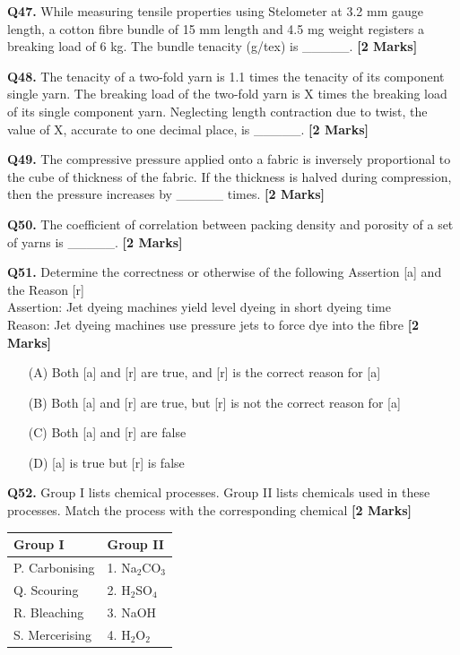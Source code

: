 \documentclass[11pt]{article}
\newcommand{\questionb}[2]{
    \noindent\textbf{Q#2.} #1 \hfill \textbf{[2 Marks]}
}
\begin{document}
\questionb{While measuring tensile properties using Stelometer at 3.2 mm gauge length, a cotton fibre bundle of 15 mm length and 4.5 mg weight registers a breaking load of 6 kg. The bundle tenacity (g/tex) is \_\_\_\_\_.}{47}
\vspace{0.5cm}

\questionb{The tenacity of a two-fold yarn is 1.1 times the tenacity of its component single yarn. The breaking load of the two-fold yarn is X times the breaking load of its single component yarn. Neglecting length contraction due to twist, the value of X, accurate to one decimal place, is \_\_\_\_\_.}{48}
\vspace{0.5cm}

\questionb{The compressive pressure applied onto a fabric is inversely proportional to the cube of thickness of the fabric. If the thickness is halved during compression, then the pressure increases by \_\_\_\_\_ times.}{49}
\vspace{0.5cm}

\questionb{The coefficient of correlation between packing density and porosity of a set of yarns is \_\_\_\_\_.}{50}
\vspace{0.5cm}

\questionb{Determine the correctness or otherwise of the following Assertion [a] and the Reason [r] \\

Assertion: Jet dyeing machines yield level dyeing in short dyeing time \\ 
Reason: Jet dyeing machines use pressure jets to force dye into the fibre }{51} 

\begin{enumerate}
    \item[(A)] Both [a] and [r] are true, and [r] is the correct reason for [a]  
    \item[(B)] Both [a] and [r] are true, but [r] is not the correct reason for [a]  
    \item[(C)] Both [a] and [r] are false  
    \item[(D)] [a] is true but [r] is false  
\end{enumerate}
\vspace{0.5cm}

\questionb{Group I lists chemical processes. Group II lists chemicals used in these processes. Match the process with the corresponding chemical}{52}

\begin{center}
\begin{tabular}{|l|l|}
\hline
\textbf{Group I} & \textbf{Group II} \\
\hline
P. Carbonising & 1. Na\(_2\)CO\(_3\) \\
Q. Scouring & 2. H\(_2\)SO\(_4\) \\
R. Bleaching & 3. NaOH \\
S. Mercerising & 4. H\(_2\)O\(_2\) \\
\hline
\end{tabular}
\end{center}
\end{document}
